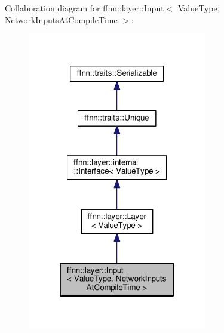 Collaboration diagram for ffnn\-:\-:layer\-:\-:Input$<$ Value\-Type, Network\-Inputs\-At\-Compile\-Time $>$\-:
\nopagebreak
\begin{figure}[H]
\begin{center}
\leavevmode
\includegraphics[width=222pt]{classffnn_1_1layer_1_1_input__coll__graph}
\end{center}
\end{figure}
